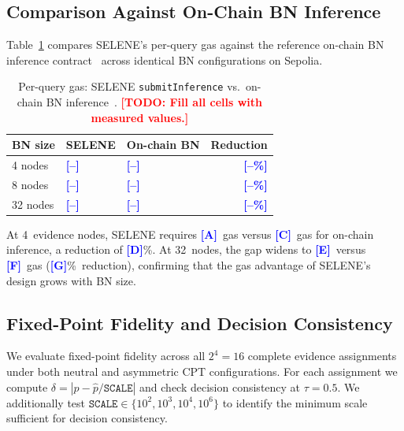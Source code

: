 \documentclass[journal]{IEEEtran}
\newcommand{\todo}[1]{\textcolor{red}{\textbf{[TODO: #1]}}}
\newcommand{\placeholder}[1]{\textcolor{blue}{\textbf{[#1]}}}
\begin{document}
\subsection{Comparison Against On-Chain BN Inference}
\label{sec:exp-comparison}

Table~\ref{tab:gas-comparison} compares SELENE's
per-query gas against the reference on-chain BN
inference contract~\cite{bn-oracle} across identical
BN configurations on Sepolia.

\begin{table}[t]
\centering
\caption{Per-query gas: SELENE \texttt{submitInference}
vs.\ on-chain BN inference~\cite{bn-oracle}.
\todo{Fill all cells with measured values.}}
\label{tab:gas-comparison}
\begin{tabularx}{\columnwidth}{lXXr}
\toprule
\textbf{BN size} &
\textbf{SELENE} &
\textbf{On-chain BN} &
\textbf{Reduction} \\
\midrule
4 nodes  &
  \placeholder{--} & \placeholder{--} &
  \placeholder{--\%} \\
8 nodes  &
  \placeholder{--} & \placeholder{--} &
  \placeholder{--\%} \\
32 nodes &
  \placeholder{--} & \placeholder{--} &
  \placeholder{--\%} \\
\bottomrule
\end{tabularx}
\end{table}

At 4~evidence nodes, SELENE requires \placeholder{A}~gas
versus \placeholder{C}~gas for on-chain inference, a
reduction of \placeholder{D}\%.
At 32~nodes, the gap widens to \placeholder{E}~versus
\placeholder{F}~gas (\placeholder{G}\%~reduction),
confirming that the gas advantage of SELENE's design
grows with BN size.

\subsection{Fixed-Point Fidelity and Decision
Consistency}
\label{sec:exp-fidelity}

We evaluate fixed-point fidelity across all $2^4=16$
complete evidence assignments under both neutral and
asymmetric CPT configurations. For each assignment
we compute
$\delta=|p-\widehat{p}/\texttt{SCALE}|$ and check
decision consistency at $\tau=0.5$.
We additionally test
$\texttt{SCALE}\in\{10^2,10^3,10^4,10^6\}$ to
identify the minimum scale sufficient for decision
consistency.
\end{document}
